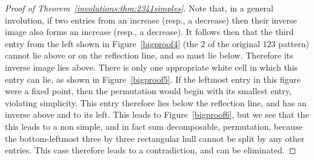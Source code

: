 \documentclass[12pt,twoside]{memoir}
\begin{document}
\begin{proof}[Proof of Theorem~\ref{involutions:thm:2341simples}]
          Note that, in a general involution, if two entries from an increase
          (resp., a decrease) then their inverse image also forms an increase
          (resp., a decrease). It follows then that the third entry from the left
          shown in Figure~\ref{bigproof4} (the $2$ of the original $123$ pattern)
          cannot lie above or on the reflection line, and so must lie below.
          Therefore its inverse image lies above. There is only one appropriate
          white cell in which this entry can lie, as shown in
          Figure~\ref{bigproof5}. If the leftmost entry in this figure were a
          fixed point, then the permutation would begin with its smallest entry,
          violating simplicity. This entry therefore lies below the reflection
          line, and has an inverse above and to its left. This leads to
          Figure~\ref{bigproof6}, but we see that the this leads to a non simple,
          and in fact sum decomposable, permutation, because the bottom-leftmost
          three by three rectangular hull cannot be split by any other entries.
          This case therefore leads to a contradiction, and can be eliminated. 
          

\end{proof}
\end{document}
